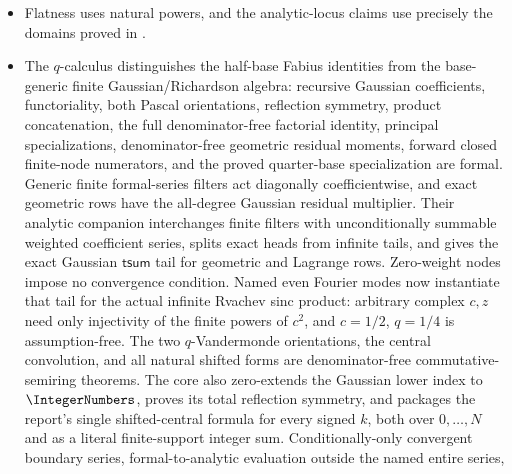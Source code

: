 \documentclass[11pt,oneside]{article}
\theoremstyle{definition}
\theoremstyle{remark}
\begin{document}
\begin{itemize}
      continuity, local-compactness, completeness, and big-\(O\) hypotheses stated in
      .  For complex \(q\) with
      \(\lVert q\rVert<1\), this gives the entire reciprocal-Gamma product, its zero orbit,
      Mahler and reflection equations, and the dyadic zero and meromorphic pole orders.
      The Gamma-side functions are totalized pointwise inverses: raw products of Gamma
      factors away from their poles, arithmetic canonical regroupings, logarithmic,
      digamma, Malmsten, heat-trace, integral, D-finite, reciprocal-Gamma derivative-tower,
      and general-base order statements are not claimed.
\item Flatness uses natural powers, and the analytic-locus claims use precisely the domains
      proved in .
\item The \(q\)-calculus distinguishes the half-base Fabius identities from the
      base-generic finite Gaussian/Richardson algebra: recursive Gaussian coefficients,
      functoriality, both Pascal orientations, reflection symmetry, product
      concatenation, the full denominator-free factorial identity, principal
      specializations, denominator-free geometric residual moments, forward closed
      finite-node numerators, and the proved quarter-base specialization are formal.
      Generic finite formal-series filters act diagonally coefficientwise, and exact
      geometric rows have the all-degree Gaussian residual multiplier.  Their analytic
      companion interchanges finite filters with unconditionally summable weighted
      coefficient series, splits exact heads from infinite tails, and gives the exact
      Gaussian \(\mathsf{tsum}\) tail for geometric and Lagrange rows.  Zero-weight nodes
      impose no convergence condition.  Named even Fourier modes now instantiate that
      tail for the actual infinite Rvachev sinc product: arbitrary complex \(c,z\) need
      only injectivity of the finite powers of \(c^2\), and \(c=1/2\), \(q=1/4\) is
      assumption-free.  The two \(q\)-Vandermonde orientations, the central convolution,
      and all natural shifted forms are denominator-free commutative-semiring theorems.
      The core also zero-extends the Gaussian lower index to \(\IntegerNumbers\), proves its total
      reflection symmetry, and packages the report's single shifted-central formula for
      every signed \(k\), both over \(0,\ldots,N\) and as a literal finite-support
      integer sum.  Conditionally-only convergent
      boundary series, formal-to-analytic evaluation outside the named entire series,

\end{itemize}
\end{document}
